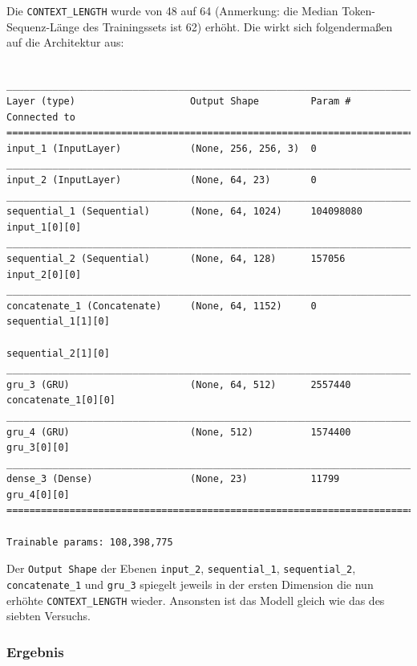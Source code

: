 \documentclass[pdftex,a4paper,halfparskip, article]{scrartcl}
\begin{document}
Die \texttt{CONTEXT\_LENGTH} wurde von 48 auf 64 (Anmerkung: die Median Token-Sequenz-Länge des Trainingssets ist 62) erhöht. Die wirkt sich folgendermaßen auf die Architektur aus:
\begin{verbatim}

_____________________________________________________________________________
Layer (type)                    Output Shape         Param #     Connected to
=============================================================================
input_1 (InputLayer)            (None, 256, 256, 3)  0
_____________________________________________________________________________
input_2 (InputLayer)            (None, 64, 23)       0
_____________________________________________________________________________
sequential_1 (Sequential)       (None, 64, 1024)     104098080   input_1[0][0]
_____________________________________________________________________________
sequential_2 (Sequential)       (None, 64, 128)      157056      input_2[0][0]
_____________________________________________________________________________
concatenate_1 (Concatenate)     (None, 64, 1152)     0           sequential_1[1][0]
                                                                 sequential_2[1][0]
_____________________________________________________________________________
gru_3 (GRU)                     (None, 64, 512)      2557440     concatenate_1[0][0]
_____________________________________________________________________________
gru_4 (GRU)                     (None, 512)          1574400     gru_3[0][0]
_____________________________________________________________________________
dense_3 (Dense)                 (None, 23)           11799       gru_4[0][0]
=============================================================================

Trainable params: 108,398,775

\end{verbatim}

Der \texttt{Output Shape} der Ebenen \texttt{input\_2},  \texttt{sequential\_1},  \texttt{sequential\_2},  \texttt{concatenate\_1} und \texttt{gru\_3} spiegelt jeweils in der ersten Dimension die nun erhöhte \texttt{CONTEXT\_LENGTH} wieder.
Ansonsten ist das Modell gleich wie das des siebten Versuchs.
\subsubsection*{Ergebnis}
\end{document}
